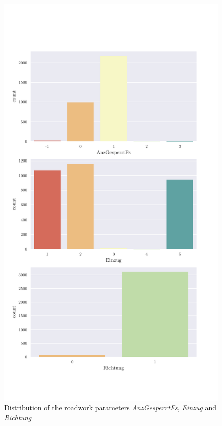    \begin{figure}[ht!]
        \centering
        \includegraphics[scale=0.7]{CorrAnalysis/data/ArbIS/02_matched/plots/arbis_matched_count_multiple01}
        \caption{Distribution of the roadwork parameters \textit{AnzGesperrtFs}, \textit{Einzug} and \textit{Richtung}}
        \label{img:arbis_matched_AnzGesperrtFs}
        \label{img:arbis_matched_Einzug}
        \label{img:arbis_matched_Richtung}
    \end{figure}

